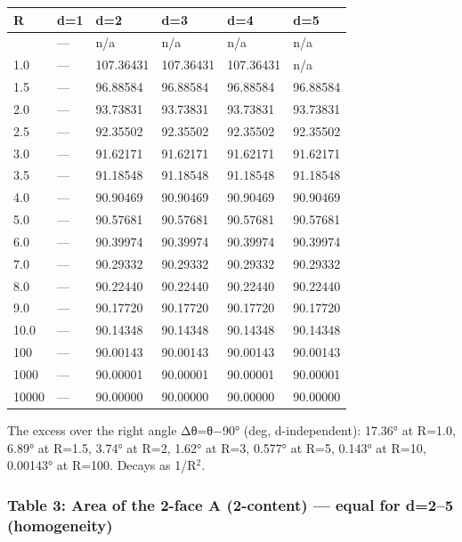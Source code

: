 \documentclass[
]{ltjsarticle}
\newcounter{none} %
\begin{document}
{\def\LTcaptype{none} %
\begin{longtable}[]{@{}llllll@{}}
\toprule\noalign{}
R & d=1 & d=2 & d=3 & d=4 & d=5 \\
\midrule\noalign{}
\endhead
\bottomrule\noalign{}
\endlastfoot
0.5 & --- & n/a & n/a & n/a & n/a \\
1.0 & --- & 107.36431 & 107.36431 & 107.36431 & n/a \\
1.5 & --- & 96.88584 & 96.88584 & 96.88584 & 96.88584 \\
2.0 & --- & 93.73831 & 93.73831 & 93.73831 & 93.73831 \\
2.5 & --- & 92.35502 & 92.35502 & 92.35502 & 92.35502 \\
3.0 & --- & 91.62171 & 91.62171 & 91.62171 & 91.62171 \\
3.5 & --- & 91.18548 & 91.18548 & 91.18548 & 91.18548 \\
4.0 & --- & 90.90469 & 90.90469 & 90.90469 & 90.90469 \\
5.0 & --- & 90.57681 & 90.57681 & 90.57681 & 90.57681 \\
6.0 & --- & 90.39974 & 90.39974 & 90.39974 & 90.39974 \\
7.0 & --- & 90.29332 & 90.29332 & 90.29332 & 90.29332 \\
8.0 & --- & 90.22440 & 90.22440 & 90.22440 & 90.22440 \\
9.0 & --- & 90.17720 & 90.17720 & 90.17720 & 90.17720 \\
10.0 & --- & 90.14348 & 90.14348 & 90.14348 & 90.14348 \\
100 & --- & 90.00143 & 90.00143 & 90.00143 & 90.00143 \\
1000 & --- & 90.00001 & 90.00001 & 90.00001 & 90.00001 \\
10000 & --- & 90.00000 & 90.00000 & 90.00000 & 90.00000 \\
\end{longtable}
}

The excess over the right angle Δθ=θ−90° (deg, d-independent): 17.36° at
R=1.0, 6.89° at R=1.5, 3.74° at R=2, 1.62° at R=3, 0.577° at R=5, 0.143°
at R=10, 0.00143° at R=100. Decays as 1/R\(^{2}\).

\subsubsection{Table 3: Area of the 2-face A (2-content) --- equal for
d=2--5
(homogeneity)}\label{table-3-area-of-the-2-face-a-2-content-equal-for-d25-homogeneity}
\end{document}
